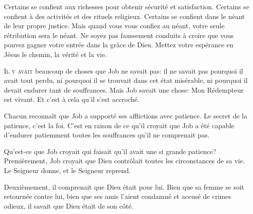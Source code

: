 Certains se confient aux richesses pour obtenir sécurité et satisfaction.
 Certains se confient à des activités et des rituels religieux.
 Certains se confient dans le néant de leur propre justice.
 Mais quand vous vous confiez au néant, votre seule rétribution sera le néant.
 Ne soyez pas faussement conduits à croire que vous pouvez gagner
 votre entrée dans la grâce de Dieu.
 Mettez votre espérance en Jésus \ocadr{}le chemin, la vérité et la vie.

\dvrule







\lettrine{I}{l y avait} beaucoup de choses que Job ne savait pas:
 il ne savait pas pourquoi il avait tout perdu, ni pourquoi
 il se trouvait dans cet état misérable,
 ni pourquoi il devait endurer tant de souffrances.
 Mais Job savait une chose: \Og Mon Rédempteur est vivant. \Fg{}
 Et c'est à cela qu'il s'est accroché. 

Chacun reconnaît que Job a supporté ses afflictions avec patience.
 Le secret de la patience, c'est la foi. C'est en raison de ce qu'il croyait
 que Job a été capable d'endurer patiemment toutes les souffrances
 qu'il ne comprenait pas. 


Qu'est-ce que Job croyait qui faisait qu'il avait une si grande patience?
 Premièrement, Job croyait que Dieu contrôlait toutes les circonstances
 de sa vie. Le Seigneur donne, et le Seigneur reprend. 

Deuxièmement, il comprenait que Dieu était pour lui.
 Bien que sa femme se soit retournée contre lui,
 bien que ses amis l'aient condamné et accusé de crimes odieux,
 il savait que Dieu était de son côté. 

